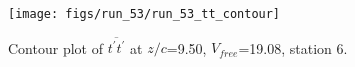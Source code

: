 \begin{figure}[H]
\centering
\texttt{[image: figs/run\_53/run\_53\_tt\_contour]}
\caption{Contour plot of $\overline{t^\prime t^\prime}$ at $z/c$=9.50, $V_{free}$=19.08, station 6.}
\end{figure}


